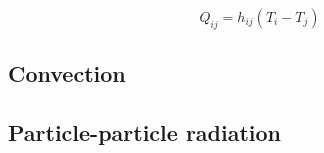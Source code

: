 \begin{equation}
	Q_{ij} = h_{ij}(T_i - T_j)
\end{equation} 











\subsection{Convection}











\subsection{Particle-particle radiation}